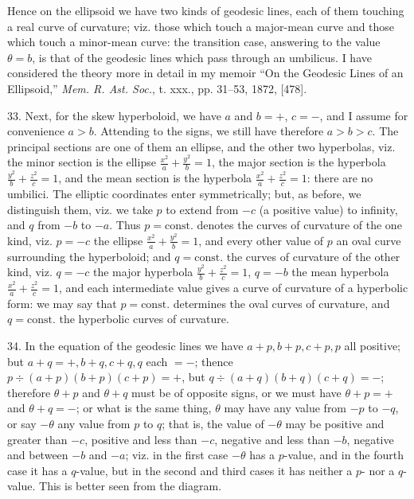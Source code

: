 \documentclass[11pt,a4paper]{article}
\begin{document}
\begin{center}
\end{center}

Hence on the ellipsoid we have two kinds of geodesic lines, each of them touching a real
curve of curvature; viz. those which touch a major-mean curve and those which touch a
minor-mean curve: the transition case, answering to the value $\theta=b$, is that of the
geodesic lines which pass through an umbilicus. I have considered the theory more in detail
in my memoir ``On the Geodesic Lines of an Ellipsoid,'' \emph{Mem. R. Ast. Soc.}, t. xxx.,
pp. 31--53, 1872, [478].

33. Next, for the skew hyperboloid, we have $a$ and $b=+$, $c=-$, and I assume for
convenience $a>b$. Attending to the signs, we still have therefore $a>b>c$. The principal
sections are one of them an ellipse, and the other two hyperbolas, viz. the minor section is
the ellipse $\frac{x^2}{a}+\frac{y^2}{b}=1$, the major section is the hyperbola
$\frac{y^2}{b}+\frac{z^2}{c}=1$, and the mean section is the hyperbola
$\frac{x^2}{a}+\frac{z^2}{c}=1$: there are no umbilici. The elliptic coordinates enter
symmetrically; but, as before, we distinguish them, viz. we take $p$ to extend from $-c$
(a positive value) to infinity, and $q$ from $-b$ to $-a$. Thus $p=\mathrm{const.}$ denotes
the curves of curvature of the one kind, viz. $p=-c$ the ellipse
$\frac{x^2}{a}+\frac{y^2}{b}=1$, and every other value of $p$ an oval curve surrounding the
hyperboloid; and $q=\mathrm{const.}$ the curves of curvature of the other kind, viz.
$q=-c$ the major hyperbola $\frac{y^2}{b}+\frac{z^2}{c}=1$, $q=-b$ the mean hyperbola
$\frac{x^2}{a}+\frac{z^2}{c}=1$, and each intermediate value gives a curve of curvature
of a hyperbolic form: we may say that $p=\mathrm{const.}$ determines the oval curves of
curvature, and $q=\mathrm{const.}$ the hyperbolic curves of curvature.

34. In the equation of the geodesic lines we have $a+p,b+p,c+p,p$ all positive; but
$a+q=+,b+q,c+q,q$ each $=-$; thence
$p\div(a+p)(b+p)(c+p)=+$, but $q\div(a+q)(b+q)(c+q)=-$; therefore $\theta+p$ and
$\theta+q$ must be of opposite signs, or we must have $\theta+p=+$ and $\theta+q=-$;
or what is the same thing, $\theta$ may have any value from $-p$ to $-q$, or say
$-\theta$ any value from $p$ to $q$; that is, the value of $-\theta$ may be positive and
greater than $-c$, positive and less than $-c$, negative and less than $-b$, negative and
between $-b$ and $-a$; viz. in the first case $-\theta$ has a $p$-value, and in the fourth
case it has a $q$-value, but in the second and third cases it has neither a $p$- nor a
$q$-value. This is better seen from the diagram.
\end{document}
